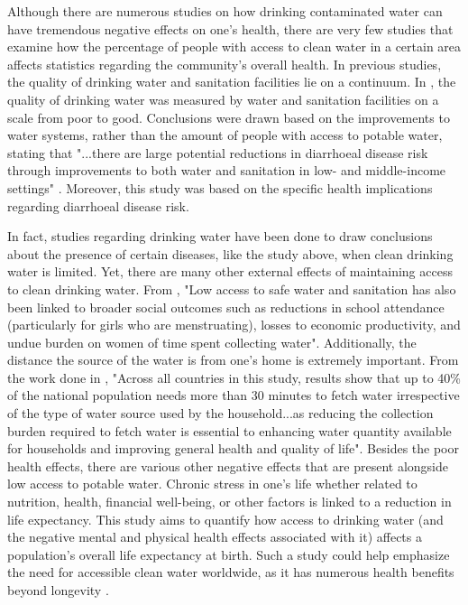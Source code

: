 \documentclass[12pt]{article}
\begin{document}
Although there are numerous studies on how drinking contaminated water can have tremendous negative effects on one's health, there are very few studies that examine how the percentage of people with access to clean water in a certain area affects statistics regarding the community's overall health. In previous studies, the quality of drinking water and sanitation facilities lie on a continuum. In \citet{wolf2014sanitationondisease}, the quality of drinking water was measured by water and sanitation facilities on a scale from poor to good. Conclusions were drawn based on the improvements to water systems, rather than the amount of people with access to potable water, stating that "...there are large potential reductions in diarrhoeal disease risk through improvements to both water and sanitation in low- and middle-income settings" \citep{wolf2014sanitationondisease}. Moreover, this study was based on the specific health implications regarding diarrhoeal disease risk.

In fact, studies regarding drinking water have been done to draw conclusions about the presence of certain diseases, like the study above, when clean drinking water is limited. Yet, there are many other external effects of maintaining access to clean drinking water. From \citet{2020mappinggeo}, "Low access to safe water and sanitation has also been linked to broader social outcomes such as reductions in school attendance (particularly for girls who are menstruating), losses to economic productivity, and undue burden on women of time spent collecting water". Additionally, the distance the source of the water is from one's home is extremely important. From the work done in \citet{2018waterandhealth}, "Across all countries in this study, results show that up to 40\% of the national population needs more than 30 minutes to fetch water irrespective of the type of water source used by the household...as reducing the collection burden required to fetch water is essential to enhancing water quantity available for households and improving general health and quality of life". Besides the poor health effects, there are various other negative effects that are present alongside low access to potable water. Chronic stress in one's life whether related to nutrition, health, financial well-being, or other factors is linked to a reduction in life expectancy. This study aims to quantify how access to drinking water (and the negative mental and physical health effects associated with it) affects a population's overall life expectancy at birth. Such a study could help emphasize the need for accessible clean water worldwide, as it has numerous health benefits beyond longevity \citep{popkin2010waterhealth}.
\end{document}
